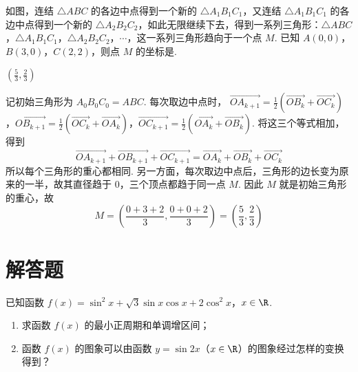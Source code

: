 \begin{problem}
如图，连结 \(\triangle ABC\) 的各边中点得到一个新的 \(\triangle A_{1}B_{1}C_{1}\)，又连结 \(\triangle A_{1}B_{1}C_{1}\) 的各边中点得到一个新的 \(\triangle A_{2}B_{2}C_{2}\)，如此无限继续下去，得到一系列三角形：\(\triangle ABC\)，\(\triangle A_{1}B_{1}C_{1}\)，\(\triangle A_{2}B_{2}C_{2}\)，\(\cdots\)，这一系列三角形趋向于一个点 \(M\). 已知 \(A(0,0)\)，\(B(3,0)\)，\(C(2,2)\)，则点 \(M\) 的坐标是\fillinblank{}.
\end{problem}

\begin{answer}
\(\left(\frac{5}{3},\frac{2}{3}\right)\)
\end{answer}

\begin{solution}
记初始三角形为 \(A_0B_0C_0=ABC\). 每次取边中点时，
\(\overrightarrow{OA_{k+1}}=\frac{1}{2}\left(\overrightarrow{OB_k}+\overrightarrow{OC_k}\right)\)，\(\overrightarrow{OB_{k+1}}=\frac{1}{2}\left(\overrightarrow{OC_k}+\overrightarrow{OA_k}\right)\)，\(\overrightarrow{OC_{k+1}}=\frac{1}{2}\left(\overrightarrow{OA_k}+\overrightarrow{OB_k}\right)\).
将这三个等式相加，得到
\[
\overrightarrow{OA_{k+1}}+\overrightarrow{OB_{k+1}}+\overrightarrow{OC_{k+1}}=\overrightarrow{OA_k}+\overrightarrow{OB_k}+\overrightarrow{OC_k}
\]
所以每个三角形的重心都相同. 另一方面，每次取边中点后，三角形的边长变为原来的一半，故其直径趋于 \(0\)，三个顶点都趋于同一点 \(M\). 因此 \(M\) 就是初始三角形的重心，故
\[
M=\left(\frac{0+3+2}{3},\frac{0+0+2}{3}\right)=\left(\frac{5}{3},\frac{2}{3}\right)
\]
\end{solution}

\section{解答题}
\begin{problem}
已知函数 \(f(x) = \sin^2 x + \sqrt{3}\sin x\cos x + 2\cos^2 x\)，\(x \in \R\).

\begin{enumerate}
\item 求函数 \( f(x) \) 的最小正周期和单调增区间；
\item 函数 \( f(x) \) 的图象可以由函数 \( y = \sin 2x \)（\(x \in \R\)）的图象经过怎样的变换得到？
\end{enumerate}
\end{problem}

